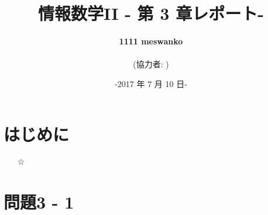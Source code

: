 \documentclass[12pt,a4paper]{jsarticle}
\title{\Huge 情報数学II - 第 3 章レポート-}
\author{\textbf{1111  meswanko} \\\\ (協力者: )}
\date{\fontsize{7pt}{0pt}-2017 年 7 月 10 日-\selectfont}
\begin{document}
\maketitle

\thispagestyle{empty}
\section*{はじめに}
\begin{itemize}
 \item[☆] \mbox{} \\
\end{itemize}
\fi
\pagebreak



\setcounter{page}{1}
\section*{問題3 - 1}
\end{document}
